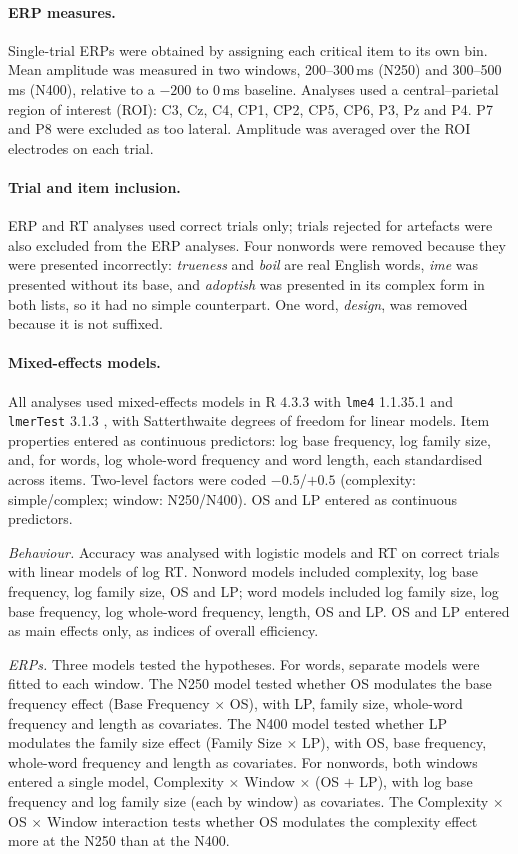 \paragraph{ERP measures.}
Single-trial ERPs were obtained by assigning each critical item to its own bin.
Mean amplitude was measured in two windows, 200--300\,ms (N250) and
300--500\,ms (N400), relative to a $-200$ to 0\,ms baseline. Analyses used a
central--parietal region of interest (ROI): C3, Cz, C4, CP1, CP2, CP5, CP6, P3,
Pz and P4. P7 and P8 were excluded as too lateral. Amplitude was averaged over
the ROI electrodes on each trial.

\paragraph{Trial and item inclusion.}
ERP and RT analyses used correct trials only; trials rejected for artefacts were
also excluded from the ERP analyses. Four nonwords were removed because they
were presented incorrectly: \textit{trueness} and \textit{boil} are real English
words, \textit{ime} was presented without its base, and \textit{adoptish} was
presented in its complex form in both lists, so it had no simple counterpart.
One word, \textit{design}, was removed because it is not suffixed.

\paragraph{Mixed-effects models.}
All analyses used mixed-effects models in R 4.3.3 with \texttt{lme4} 1.1.35.1
\citep{batesFittingLinearMixedeffects2015}
and \texttt{lmerTest} 3.1.3 \citep{kuznetsovaLmerTestPackageTests2017}, with
Satterthwaite degrees of freedom for linear models. Item properties entered as
continuous predictors: log base frequency, log family size, and, for words, log
whole-word frequency and word length, each standardised across items. Two-level
factors were coded $-0.5$/$+0.5$ (complexity: simple/complex; window: N250/N400).
OS and LP entered as continuous predictors.

\textit{Behaviour.} Accuracy was analysed with logistic models and RT on correct
trials with linear models of log RT. Nonword models included complexity, log
base frequency, log family size, OS and LP; word models included log family
size, log base frequency, log whole-word frequency, length, OS and LP. OS and LP
entered as main effects only, as indices of overall efficiency.

\textit{ERPs.} Three models tested the hypotheses. For words, separate models
were fitted to each window. The N250 model tested whether OS modulates the base
frequency effect (Base Frequency $\times$ OS), with LP, family size, whole-word
frequency and length as covariates. The N400 model tested whether LP modulates
the family size effect (Family Size $\times$ LP), with OS, base frequency,
whole-word frequency and length as covariates. For nonwords, both windows entered
a single model, Complexity $\times$ Window $\times$ (OS $+$ LP), with log base
frequency and log family size (each by window) as covariates. The Complexity
$\times$ OS $\times$ Window interaction tests whether OS modulates the complexity
effect more at the N250 than at the N400.

